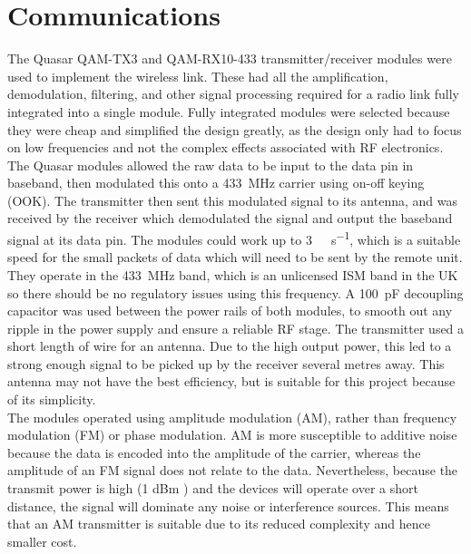 \section{Communications}

The Quasar QAM-TX3 \cite{qam-tx} and QAM-RX10-433 \cite{qam-rx} transmitter/receiver modules were used to implement the wireless link. These had all the amplification, demodulation, filtering, and other signal processing required for a radio link fully integrated into a single module. Fully integrated modules were selected because they were cheap and simplified the design greatly, as the design only had to focus on low frequencies and not the complex effects associated with RF electronics. The Quasar modules allowed the raw data to be input to the data pin in baseband, then modulated this onto a \SI{433}{\mega\hertz} carrier using on-off keying (OOK). The transmitter then sent this modulated signal to its antenna, and was received by the receiver which demodulated the signal and output the baseband signal at its data pin. The modules could work up to \SI{3}{\kilo\bit\per\second}, which is a suitable speed for the small packets of data which will need to be sent by the remote unit. They operate in the \SI{433}{\mega\hertz} band, which is an unlicensed ISM band in the UK \cite{ism_band} so there should be no regulatory issues using this frequency. A \SI{100}{\pico\farad} decoupling capacitor was used between the power rails of both modules, to smooth out any ripple in the power supply and ensure a reliable RF stage. The transmitter used a short length of wire for an antenna. Due to the high output power, this led to a strong enough signal to be picked up by the receiver several metres away. This antenna may not have the best efficiency, but is suitable for this project because of its simplicity.\\

The modules operated using amplitude modulation (AM), rather than frequency modulation (FM) or phase modulation. AM is more susceptible to additive noise because the data is encoded into the amplitude of the carrier, whereas the amplitude of an FM signal does not relate to the data. Nevertheless, because the transmit power is high (1 dBm \cite{qam-tx}) and the devices will operate over a short distance, the signal will dominate any noise or interference sources. This means that an AM transmitter is suitable due to its reduced complexity and hence smaller cost.\\

